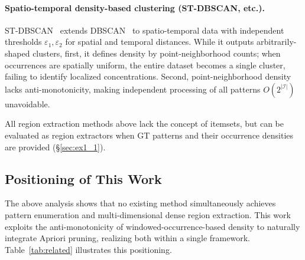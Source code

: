 \paragraph{Spatio-temporal density-based clustering (ST-DBSCAN, etc.).}
ST-DBSCAN~\cite{birant2007stdbscan} extends
DBSCAN~\cite{ester1996dbscan} to spatio-temporal data
with independent thresholds $\varepsilon_1, \varepsilon_2$
for spatial and temporal distances.
While it outputs arbitrarily-shaped clusters,
first, it defines density by point-neighborhood counts;
when occurrences are spatially uniform,
the entire dataset becomes a single cluster,
failing to identify localized concentrations.
Second, point-neighborhood density lacks anti-monotonicity,
making independent processing of all patterns
$O(2^{|\mathcal{I}|})$ unavoidable.

All region extraction methods above lack the concept of itemsets,
but can be evaluated as region extractors
when GT patterns and their occurrence densities are provided
(\S\ref{sec:ex1_1}).

\subsection{Positioning of This Work}

The above analysis shows that no existing method
simultaneously achieves pattern enumeration
and multi-dimensional dense region extraction.
This work exploits the anti-monotonicity
of windowed-occurrence-based density
to naturally integrate Apriori pruning,
realizing both within a single framework.
Table~\ref{tab:related} illustrates this positioning.


